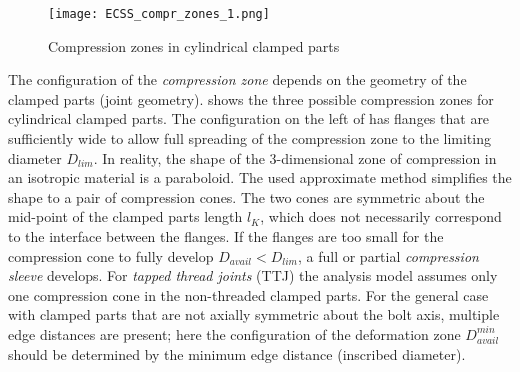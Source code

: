 \begin{figure}[!htpb]
  \centering
  \texttt{[image: ECSS\_compr\_zones\_1.png]}
  \caption{Compression zones in cylindrical clamped parts \cite{ECSS_HB_32_23A}}
  \label{fig:ECSS_compr_zones_1}
\end{figure}
The configuration of the \emph{compression zone} depends on the geometry of the clamped parts (joint
geometry).  shows the three possible compression zones for cylindrical 
clamped parts\footnotemark[3]. 
The configuration on the left of  has flanges that are sufficiently wide to
allow full spreading of the compression zone to the limiting diameter $D_{lim}$. In reality, the shape 
of the 3-dimensional zone of compression in an isotropic material is a paraboloid. The used 
approximate method simplifies the shape to a pair of compression cones. The two cones are symmetric 
about the mid-point of the clamped parts length $l_K$, which does not necessarily correspond to the 
interface between the flanges. If the flanges are too small for the compression cone to fully develop
$D_{avail}<D_{lim}$, a full or partial \emph{compression sleeve} develops. For \emph{tapped thread joints}
(TTJ) the analysis model assumes only one compression cone in the non-threaded clamped parts. 
For the general case with clamped parts that are not axially symmetric about the bolt axis, multiple 
edge distances are present; here the configuration of the deformation zone $D_{avail}^{min}$
should be determined by the minimum edge distance (inscribed diameter).
